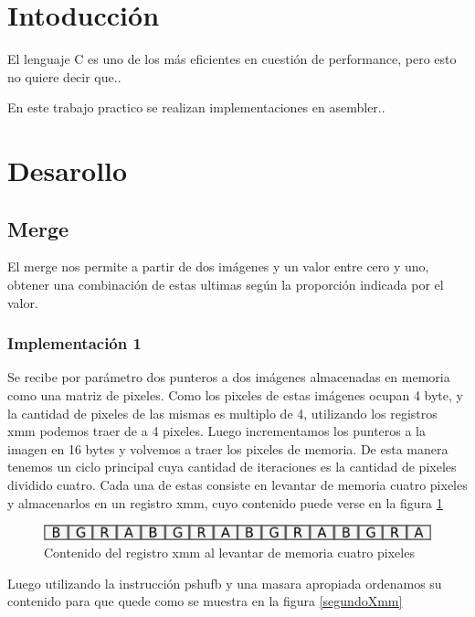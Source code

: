 \documentclass[a4paper]{article}
\begin{document}
\section{Intoducción}

El lenguaje C es uno de los más eficientes en cuestión de performance, pero esto no quiere decir que..

En este trabajo practico se realizan implementaciones en asembler..

\section{Desarollo}

\subsection{Merge}

El merge nos permite a partir de dos imágenes y un valor entre cero y uno, obtener una combinación de estas ultimas según la proporción indicada por el valor.

\subsubsection{Implementación 1}

Se recibe por parámetro dos punteros a dos imágenes almacenadas en memoria como una matriz de pixeles. Como los pixeles de estas imágenes ocupan 4 byte, y la cantidad de pixeles de las mismas es multiplo de 4,  utilizando los registros xmm podemos traer de a 4 pixeles. Luego incrementamos los punteros a la imagen en 16 bytes y volvemos a traer los pixeles de memoria. De esta manera tenemos un ciclo principal cuya cantidad de iteraciones es la cantidad de pixeles dividido cuatro. Cada una de estas consiste en levantar de memoria cuatro pixeles y almacenarlos en un registro xmm, cuyo contenido puede verse en la figura \ref{primerXmm}

\begin{figure}[H]
\centering
\includegraphics[scale=0.8]{imagenes/primerXmm.png}
\caption{Contenido del registro xmm al levantar de memoria cuatro pixeles}
\label{primerXmm}
\end{figure}

Luego utilizando la instrucción pshufb y una masara apropiada ordenamos su contenido para que quede como se muestra en la figura \ref{segundoXmm}
\end{document}
